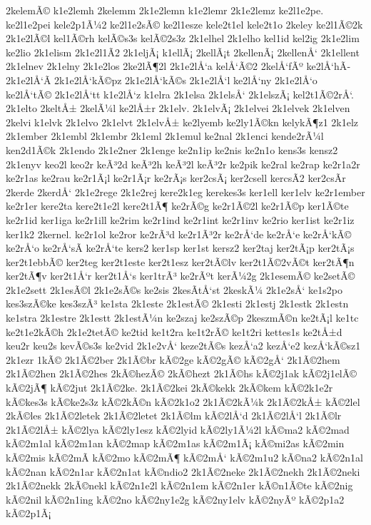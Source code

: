 {2kelemÃ©
k1e2lemh
2kelemm
2k1e2lemn
k1e2lemr
2k1e2lemz
ke2l1e2pe.
ke2l1e2pei
kele2p1Ã¼2
ke2l1e2sÃ©
ke2l1esze
kele2t1el
kele2t1o
2keley
ke2l1Ã©2k
2k1e2lÃ©l
kel1Ã©rh
kelÃ©s3s
kelÃ©2s3z
2k1elhel
2k1elho
kel1id
kel2ig
2k1e2lim
ke2lio
2k1elism
2k1e2l1Ã­2
2k1eljÃ¡
k1ellÃ¡
2kellÃ¡t
2kellenÃ¡
2kellenÅ‘
2k1ellent
2k1elnev
2k1elny
2k1e2los
2ke2lÃ¶2l
2k1e2lÅ‘a
kelÅ‘Ã©2
2kelÅ‘fÃº
ke2lÅ‘hÃ­
2k1e2lÅ‘Ã­
2k1e2lÅ‘kÃ©pz
2k1e2lÅ‘kÃ©s
2k1e2lÅ‘l
ke2lÅ‘ny
2k1e2lÅ‘o
ke2lÅ‘tÃ©
2k1e2lÅ‘tt
k1e2lÅ‘z
k1elra
2k1elsa
2k1elsÅ‘
2k1elszÃ¡
kel2t1Ã©2rÅ‘.
2k1elto
2keltÅ±
2kelÃ¼l
ke2lÅ±r
2k1elv.
2k1elvÃ¡
2k1elvei
2k1elvek
2k1elven
2kelvi
k1elvk
2k1elvo
2k1elvt
2k1elvÅ±
ke2lyemb
ke2ly1Ã©kn
kelykÃ¶z1
2k1elz
2k1ember
2k1embl
2k1embr
2k1eml
2k1emul
ke2nal
2k1enci
kende2rÃ¼l
ken2d1Ã©k
2k1endo
2k1e2ner
2k1enge
ke2n1ip
ke2nis
ke2n1o
kens3s
kensz2
2k1enyv
keo2l
keo2r
keÃ³2d
keÃ³2h
keÃ³2l
keÃ³2r
ke2pik
ke2ral
ke2rap
ke2r1a2r
ke2r1as
ke2rau
ke2r1Ã¡l
ke2r1Ã¡r
ke2rÃ¡s
ker2csÃ¡
ker2csell
kercsÃ­2
ker2csÃ­r
2kerde
2kerdÅ‘
2k1e2rege
2k1e2rej
kere2k1eg
kerekes3s
ker1ell
ker1elv
ke2r1ember
ke2r1er
kere2ta
kere2t1e2l
kere2t1Ã¶
ke2rÃ©g
ke2r1Ã©2l
ke2r1Ã©p
ker1Ã©te
ke2r1id
ker1iga
ke2r1ill
ke2rim
ke2r1ind
ke2r1int
ke2r1inv
ke2rio
ker1ist
ke2r1iz
ker1k2
2kernel.
ke2r1ol
ke2ror
ke2rÃ³d
ke2r1Ã³2r
ke2rÅ‘de
ke2rÅ‘e
ke2rÅ‘kÃ©
ke2rÅ‘o
ke2rÅ‘sÃ­
ke2rÅ‘te
kers2
ker1sp
ker1st
kersz2
ker2taj
ker2tÃ¡p
ker2tÃ¡s
ker2t1ebbÃ©
ker2teg
ker2t1este
ker2t1esz
ker2tÃ©lv
ker2t1Ã©2vÃ©t
ker2tÃ¶n
ker2tÃ¶v
ker2t1Å‘r
ker2t1Å‘s
ker1trÃ³
ke2rÃºt
kerÃ¼2g
2k1esemÃ©
ke2setÃ©
2k1e2sett
2k1esÃ©l
2k1e2sÃ©s
ke2sis
2kesÃ­tÅ‘st
2keskÃ¼
2k1e2sÅ‘
ke1s2po
kes3szÃ©ke
kes3szÃ³
ke1sta
2k1este
2k1estÃ©
2k1esti
2k1estj
2k1estk
2k1estn
ke1stra
2k1estre
2k1estt
2k1estÃ¼n
ke2szaj
ke2szÃ©p
2keszmÃ©n
ke2tÃ¡l
ke1tc
ke2t1e2kÃ©h
2k1e2tetÃ©
ke2tid
ke1t2ra
ke1t2rÃ©
ke1t2ri
kettes1s
ke2tÅ±d
keu2r
keu2s
kevÃ©s3s
ke2vid
2k1e2vÅ‘
keze2tÃ©s
kezÅ‘a2
kezÅ‘e2
kezÅ‘kÃ©sz1
2k1ezr
1kÃ©
2k1Ã©2ber
2k1Ã©br
kÃ©2ge
kÃ©2gÃ©
kÃ©2gÅ‘
2k1Ã©2hem
2k1Ã©2hen
2k1Ã©2hes
2kÃ©hezÃ©
2kÃ©hezt
2k1Ã©hs
kÃ©2j1ak
kÃ©2j1elÃ©
kÃ©2jÃ¶
kÃ©2jut
2k1Ã©2ke.
2k1Ã©2kei
2kÃ©kekk
2kÃ©kem
kÃ©2k1e2r
kÃ©kes3s
kÃ©ke2s3z
kÃ©2kÃ©n
kÃ©2k1o2
2k1Ã©2kÃ¼k
2k1Ã©2kÅ±
kÃ©2lel
2kÃ©les
2k1Ã©2letek
2k1Ã©2letet
2k1Ã©lm
kÃ©2lÅ‘d
2k1Ã©2lÅ‘l
2k1Ã©lr
2k1Ã©2lÅ±
kÃ©2lya
kÃ©2ly1esz
kÃ©2lyid
kÃ©2ly1Ã¼2l
kÃ©ma2
kÃ©2mad
kÃ©2m1al
kÃ©2m1an
kÃ©2map
kÃ©2m1as
kÃ©2m1Ã¡
kÃ©mi2as
kÃ©2min
kÃ©2mis
kÃ©2mÃ­
kÃ©2mo
kÃ©2mÃ¶
kÃ©2mÅ‘
kÃ©2m1u2
kÃ©na2
kÃ©2n1al
kÃ©2nan
kÃ©2n1ar
kÃ©2n1at
kÃ©ndio2
2k1Ã©2neke
2k1Ã©2nekh
2k1Ã©2neki
2k1Ã©2nekk
2kÃ©nekl
kÃ©2n1e2l
kÃ©2n1em
kÃ©2n1er
kÃ©n1Ã©te
kÃ©2nig
kÃ©2nil
kÃ©2n1ing
kÃ©2no
kÃ©2ny1e2g
kÃ©2ny1elv
kÃ©2nyÃº
kÃ©2p1a2
kÃ©2p1Ã¡
}

